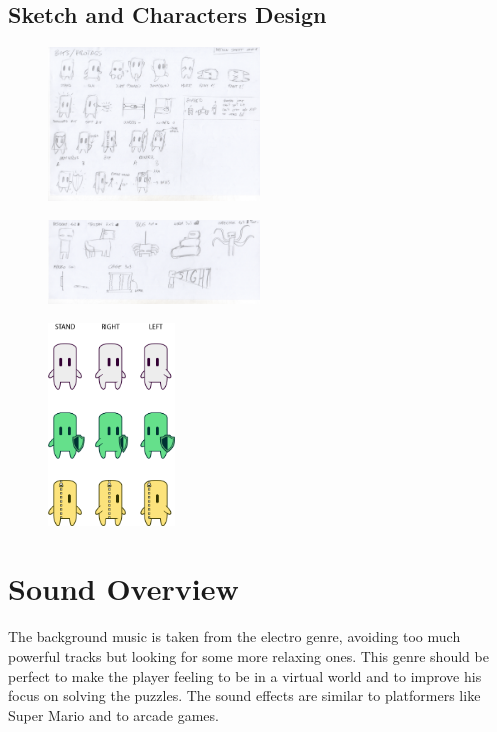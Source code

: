 \documentclass[12pt, a4paper]{report}
\begin{document}
\section*{Sketch and Characters Design}
\begin{figure}[H]
	\centering
	\includegraphics[width=0.5\textwidth]{images/Characters}
\end{figure}
	\begin{figure}[H]
	\centering
	\includegraphics[width=0.5\textwidth]{images/Enemy}
\end{figure}
	\begin{figure}[H]
	\centering
	\includegraphics[width=0.3\textwidth]{images/Bits}
\end{figure}


\chapter{Sound Overview}
The background music is taken from the electro genre, avoiding too much powerful tracks but looking for some more relaxing ones. This genre should be perfect to make the player feeling to be in a virtual world and to improve his focus on solving the puzzles. The sound effects are similar to platformers like Super Mario and to arcade games.
\end{document}
